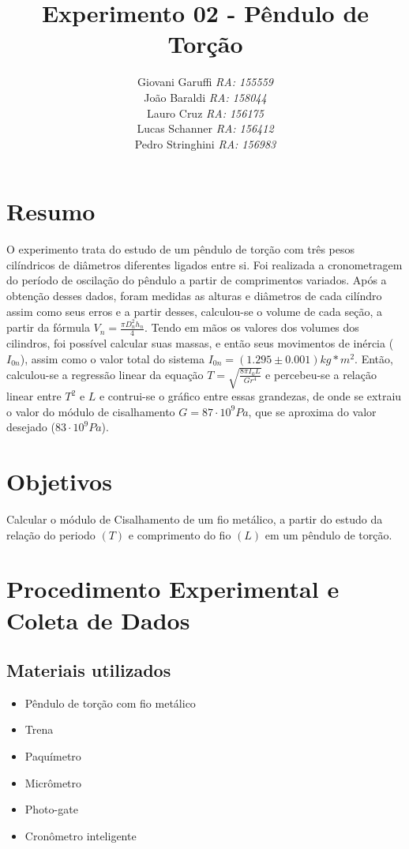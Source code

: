 \documentclass[12pt,a4paper]{article}
\begin{document}
\title{\vspace{70mm}\Huge Experimento 02 - Pêndulo de Torção}
\author{ Giovani Garuffi\qquad\hfill
		\textit {RA: 155559}\protect\\
		João Baraldi\hfill
		\textit{RA: 158044}\protect\\
		Lauro Cruz\hfill
		\textit{RA: 156175}\protect\\
		Lucas Schanner\hfill
		\textit{RA: 156412}\protect\\
		Pedro Stringhini\hfill
		\textit {RA: 156983}								
		}
\maketitle
\newpage
\section{Resumo}
O experimento trata do estudo de um pêndulo de torção com três pesos cilíndricos de diâmetros diferentes ligados entre si. Foi realizada a cronometragem do período de oscilação do pêndulo a partir de comprimentos variados. Após a obtenção desses dados, foram medidas as alturas e diâmetros de cada cilíndro assim como seus erros e a partir desses, calculou-se o volume de cada seção, a partir da fórmula $V_n = \frac{\pi D_n^2 h_n}{4}$.
Tendo em mãos os valores dos volumes dos cilindros, foi possível calcular suas massas, e então seus movimentos de inércia ($I_{0n}$), assim como o valor total do sistema $I_{0n} = (1.295 \pm 0.001)kg*m^2$.
Então, calculou-se a regressão linear da equação $T = \sqrt{\frac{8\pi I_0 L}{G r^4}}$ e percebeu-se a relação linear entre $T^2$ e $L$ e contrui-se o gráfico entre essas grandezas, de onde se extraiu o valor do módulo de cisalhamento $G =  87 \cdot 10^9 Pa$, que se aproxima do valor desejado ($83 \cdot 10^9 Pa$).

\section{Objetivos}
Calcular o módulo de Cisalhamento de um fio metálico, a partir do estudo da relação do periodo $(T)$ e comprimento do fio $(L)$ em um pêndulo de torção.


\section{Procedimento Experimental e Coleta de Dados}

\subsection{Materiais utilizados}
\begin{itemize}
	\item Pêndulo de torção com fio metálico
	\item Trena
	\item Paquímetro
	\item Micrômetro
	\item Photo-gate
	\item Cronômetro inteligente
\end{itemize}
\end{document}

